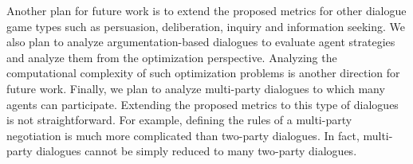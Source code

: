 Another plan for future work is to extend the proposed metrics for other dialogue game types such as persuasion, deliberation,
inquiry and information seeking. We also plan to analyze argumentation-based dialogues to evaluate agent strategies and
analyze them from the optimization perspective. Analyzing the computational complexity of such optimization problems is another
direction for future work. Finally, we plan to analyze multi-party dialogues to which many agents can participate. Extending the
proposed metrics to this type of dialogues is not straightforward. For example, defining the rules of a multi-party negotiation is
much more complicated than two-party dialogues. In fact, multi-party dialogues cannot be simply reduced to many two-party dialogues.








